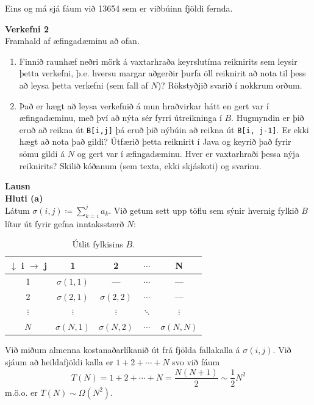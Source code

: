 \documentclass[12pt, a4paper]{article}
\begin{document}
\noindent
Eins og má sjá fáum við 13654 sem er viðbúinn fjöldi fernda.

\newpage
\noindent
\textbf{\large Verkefni 2} \medskip \\
Framhald af æfingadæminu að ofan.
\begin{enumerate}[label=(\alph*)]
    \item Finnið raunhæf neðri mörk á vaxtarhraða keyrslutíma reiknirits sem leysir þetta verkefni, þ.e. hversu margar
    aðgerðir þurfa öll reiknirit að nota til þess að leysa þetta verkefni (sem fall af $N$)? Rökstyðjið svarið í nokkrum
    orðum.

    \item Það er hægt að leysa verkefnið á mun hraðvirkar hátt en gert var í æfingadæminu, með því að nýta sér fyrri útreikninga
    í $B$. Hugmyndin er þið eruð að reikna út \texttt{B[i,j]} þá eruð þið nýbúin að reikna út \texttt{B[i, j-1]}. Er ekki hægt að
    nota það gildi? Útfærið þetta reiknirit í Java og keyrið það fyrir sömu gildi á $N$ og gert var í æfingadæminu. Hver er vaxtarhraði
    þessa nýja reiknirits? Skilið kóðanum (sem texta, ekki skjáskoti) og svarinu.
\end{enumerate}

\medskip
\noindent
\textbf{\large Lausn} \medskip \\
\textbf{Hluti (a)} \medskip \\
Látum $\sigma(i, j) \coloneqq \sum_{k = i}^j a_k$. Við getum sett upp töflu sem sýnir hvernig
fylkið $B$ lítur út fyrir gefna inntaksstærð $N$:

\renewcommand{\arraystretch}{1.25}
\begin{table}[ht!]
    \centering
    \begin{tabular}{ccccc}
        \toprule
        $\downarrow$ i $\rightarrow$ j &  1 & 2 & $\cdots$ & N \\
        \midrule
        1        & $\sigma(1, 1)$ &— & $\cdots$ & — \\
        2        & $\sigma(2, 1)$ &$\sigma(2, 2)$ & $\cdots$ & — \\
        $\vdots$ & $\vdots$ & $\vdots$ & $\ddots$ & $\vdots$ \\
        $N$ & $\sigma(N, 1)$ & $\sigma(N, 2)$ & $\cdots$ & $\sigma(N, N)$ \\ 
        \bottomrule
    \end{tabular}
    \caption{Útlit fylkisins $B$.}
\end{table}

\noindent
Við miðum almenna kostanaðarlíkanið út frá fjölda fallakalla á $\sigma(i, j)$. Við sjáum
að heildafjöldi kalla er $1 + 2 + \cdots + N$ svo við fáum
\[
    T(N) = 1 + 2 + \cdots + N = \frac{N(N + 1)}{2} \sim \frac 12 N^2
\]
m.ö.o. er $T(N) \sim \Omega(N^2)$.
\end{document}
